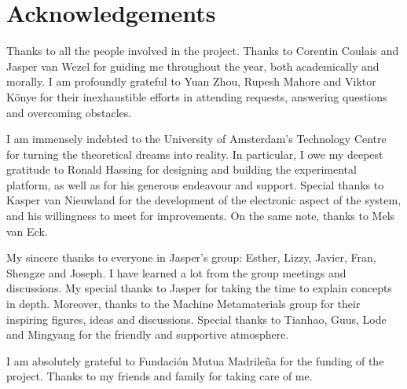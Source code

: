 \documentclass[11pt, a4paper]{article} %
\begin{document}
\newpage

\section*{Acknowledgements}

Thanks to all the people involved in the project. Thanks to Corentin Coulais and Jasper van Wezel for guiding me throughout 
the year, both academically and morally. I am profoundly grateful to Yuan Zhou, Rupesh Mahore and Viktor Könye for their 
inexhaustible efforts in attending requests, answering questions and overcoming obstacles. 

I am immensely indebted to the 
University of Amsterdam's Technology Centre for turning the theoretical dreams into reality. In particular, 
I owe my deepest gratitude to Ronald Hassing for designing and building the experimental platform, as well as for his 
generous endeavour and support. Special thanks to Kasper van Nieuwland for the development of the electronic 
aspect of the system, and his willingness to meet for improvements. On the same note, thanks to Mels van Eck. 

My sincere thanks to everyone in Jasper's group: Esther, Lizzy, Javier, Fran, Shengze and Joseph. I have learned 
a lot from the group meetings and discussions. My special thanks to Jasper for taking the time to explain concepts in depth.
Moreover, thanks to the Machine Metamaterials group for their inspiring figures, ideas and discussions. 
Special thanks to Tianhao, Guus, Lode and Mingyang for the friendly and supportive atmosphere.

I am absolutely grateful to Fundación Mutua Madrileña for the funding of the project.  
Thanks to my friends and family for taking care of me. 

\newpage

\nocite{*}
\printbibliography

\newpage
\end{document}

